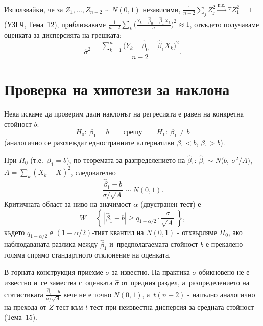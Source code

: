 \begin{defbox}
Използвайки, че за $Z_1,\dots,Z_{n-2}\sim N(0,1)$ независими,
$\tfrac1{n-2}\sum_j Z_j^2 \xrightarrow{\text{п.с.}} \mathbb EZ_1^2=1$
(УЗГЧ, Тема~12), приближаваме $\tfrac1{n-2}\sum_k\big(\tfrac{Y_k-
\hat\beta_0-\hat\beta_1X_k}\sigma\big)^2\approx1$, откъдето
получаваме оценката за дисперсията на грешката:
\[
  \hat\sigma^2 = \frac{\sum_{k=1}^n \big(Y_k-\hat\beta_0-\hat\beta_1X_k\big)^2}{n-2}.
\]
\end{defbox}

\section{Проверка на хипотези за наклона}

\begin{rembox}[Постановка]
Нека искаме да проверим дали наклонът на регресията е равен на
конкретна стойност $b$:
\[
  H_0:\ \beta_1=b \qquad \text{срещу} \qquad H_1:\ \beta_1\neq b
\]
(аналогично се разглеждат едностранните алтернативи $\beta_1<b$,
$\beta_1>b$).
\end{rembox}

\begin{rembox}
При $H_0$ (т.е.\ $\beta_1=b$), по теоремата за разпределението на
$\hat\beta_1$: $\hat\beta_1\sim N\big(b,\ \sigma^2/A\big)$, $A=
\sum_k(X_k-\bar X)^2$, следователно
\[
  \frac{\hat\beta_1-b}{\sigma/\sqrt A} \sim N(0,1).
\]
Критичната област за ниво на значимост $\alpha$ (двустранен тест) е
\[
  W = \left\{\ |\hat\beta_1-b| \ge q_{1-\alpha/2}\cdot\frac{\sigma}{\sqrt A}\ \right\},
\]
където $q_{1-\alpha/2}$ е $(1-\alpha/2)$-тият квантил на $N(0,1)$ -
отхвърляме $H_0$, ако наблюдаваната разлика между $\hat\beta_1$ и~предполагаемата стойност $b$ е прекалено голяма спрямо стандартното
отклонение на оценката.
\end{rembox}

\begin{rembox}
В горната конструкция приехме $\sigma$ за известно. На практика
$\sigma$ обикновено не е известно и~се замества с~оценката
$\hat\sigma$ от предния раздел, а~разпределението на статистиката
$\tfrac{\hat\beta_1-b}{\hat\sigma/\sqrt A}$ вече не е точно $N(0,1)$,
а~$t(n-2)$ - напълно аналогично на прехода от $Z$-тест към $t$-тест
при неизвестна дисперсия за средната стойност (Тема~15).
\end{rembox}
